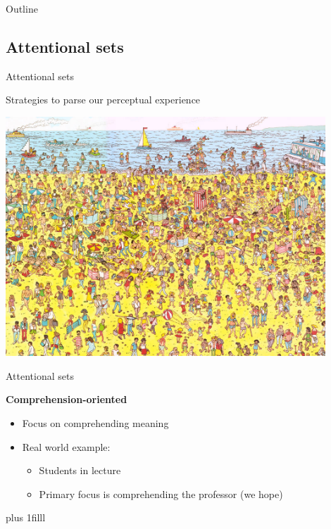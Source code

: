 \documentclass{beamer}
\newcommand{\btVFill}{\vskip0pt plus 1filll}
\begin{document}
\begin{frame}{Outline}
\tableofcontents
\end{frame}


\subsection{Attentional sets}

\begin{frame}{Attentional sets}

Strategies to parse our perceptual experience

\includegraphics[width=0.9\textwidth]{pictures/waldo}

\end{frame}

\begin{frame}{Attentional sets}

\textbf{Comprehension-oriented}
\begin{itemize}
\item Focus on comprehending meaning
\item Real world example:

\begin{itemize}
\item Students in lecture
\item Primary focus is comprehending the professor (we hope)
\end{itemize}

\end{itemize}
\btVFill
\begin{flushright}
\scriptsize
\citet{Pitt2012}
\end{flushright}

\end{frame}
\end{document}
